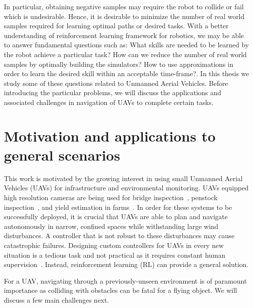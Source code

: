 \documentclass[12pt]{report}
\begin{document}
In particular, obtaining negative samples may require the robot to collide or fail which is undesirable. Hence, it is desirable to minimize the number of real world samples required for learning optimal paths or desired tasks. With a better understanding of reinforcement learning framework for robotics, we may be able to answer fundamental questions such as: What skills are needed to be learned by the robot achieve a particular task? How can we reduce the number of real world samples by optimally building the simulators? How to use approximations in order to learn the desired skill within an acceptable time-frame?. In this thesis we study some of these questions related to Unmanned Aerial Vehicles. Before introducing the particular problems, we will discuss the applications and associated challenges in navigation of UAVs to complete certain tasks.

\section{Motivation and applications to general scenarios} 
This work is motivated by the growing interest in using small Unmanned Aerial Vehicles (UAVs) for infrastructure and environmental monitoring. UAVs equipped high resolution cameras are being used for bridge inspection~\cite{liu2014review}, penstock inspection~\cite{ozaslaninspection}, and yield estimation in farms~\cite{das2015devices}. In order for these systems to be successfully deployed, it is crucial that UAVs are able to plan and navigate autonomously in narrow, confined spaces while withstanding large wind disturbances. A controller that is not robust to these disturbances may cause catastrophic failures. Designing custom controllers for UAVs in every new situation is a tedious task and not practical as it requires constant human supervision~\cite{kober2012reinforcement}. Instead, reinforcement learning (RL) can provide a general solution.\par 
For a UAV, navigating through a previously-unseen environment is of paramount importance as colliding with obstacles can be fatal for a flying object. We will discuss a few main challenges next.
\end{document}
